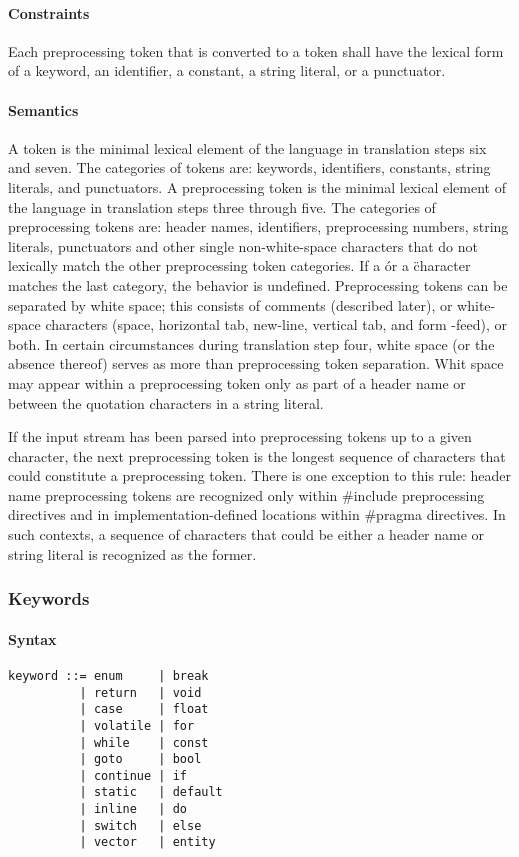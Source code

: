 \documentclass{article}
\begin{document}
\paragraph*{Constraints}
Each preprocessing token that is converted to a token shall have the lexical form of a 
keyword, an identifier, a constant, a string literal, or a punctuator.

\paragraph*{Semantics}
A token is the minimal lexical element of the language in translation steps six and seven.
The categories of tokens are: keywords, identifiers, constants, string literals, and
punctuators. A preprocessing token is the minimal lexical element of the language in
translation steps three through five. The categories of preprocessing tokens are: header
names, identifiers, preprocessing numbers, string literals, punctuators and other single
non-white-space characters that do not lexically match the other preprocessing token
categories. If a \' or a \" character matches the last category, the behavior is undefined.
Preprocessing tokens can be separated by white space; this consists of comments (described
later), or white-space characters (space, horizontal tab, new-line, vertical tab, and form
-feed), or both. In certain circumstances during translation step four, white space (or
the absence thereof) serves as more than preprocessing token separation. Whit space may 
appear within a preprocessing token only as part of a header name or between the quotation
characters in a string literal.
\linebreak

If the input stream has been parsed into preprocessing tokens up to a given character, the
next preprocessing token is the longest sequence of characters that could constitute a
preprocessing token. There is one exception to this rule: header name preprocessing tokens
are recognized only within \#include preprocessing directives and in implementation-defined
locations within \#pragma directives. In such contexts, a sequence of characters that
could be either a header name or string literal is recognized as the former.

\subsubsection{Keywords}
\paragraph*{Syntax}
\begin{lstlisting}[language=bnf]
keyword ::= enum     | break
          | return   | void
          | case     | float
          | volatile | for
          | while    | const
          | goto     | bool
          | continue | if
          | static   | default
          | inline   | do
          | switch   | else
          | vector   | entity
\end{lstlisting}
\end{document}
